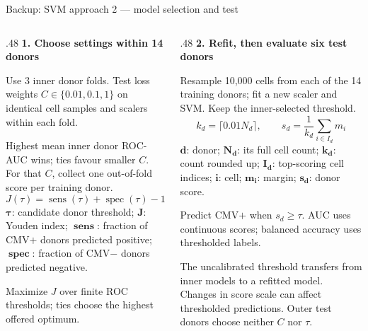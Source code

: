 \documentclass[aspectratio=169,10pt]{beamer}
\newcommand{\eyebrow}[1]{{\color{Teal}\bfseries #1}\par\smallskip}
\newcommand{\compactmath}{%
  \setlength{\abovedisplayskip}{4pt}\setlength{\belowdisplayskip}{4pt}%
  \setlength{\abovedisplayshortskip}{2pt}\setlength{\belowdisplayshortskip}{4pt}}
\begin{document}
\begin{frame}{Backup: SVM approach 2 --- model selection and test}
  \small\compactmath
  \begin{columns}[T,onlytextwidth]
    \begin{column}{.48\textwidth}
      \eyebrow{1. Choose settings within 14 donors}
      \small Use 3 inner donor folds. Test loss weights $C\in\{0.01,0.1,1\}$ on identical cell samples and scalers within each fold.\par\smallskip
      Highest mean inner donor ROC-AUC wins; ties favour smaller $C$. For that $C$, collect one out-of-fold score per training donor.
      \[J(\tau)=\operatorname{sens}(\tau)+\operatorname{spec}(\tau)-1\]
      {\scriptsize $\boldsymbol{\tau}$: candidate donor threshold; $\boldsymbol{J}$: Youden index; $\boldsymbol{\operatorname{sens}}$: fraction of CMV$+$ donors predicted positive; $\boldsymbol{\operatorname{spec}}$: fraction of CMV$-$ donors predicted negative.}\par\smallskip
      \small Maximize $J$ over finite ROC thresholds; ties choose the highest offered optimum.
    \end{column}
    \begin{column}{.48\textwidth}
      \eyebrow{2. Refit, then evaluate six test donors}
      \small Resample 10,000 cells from each of the 14 training donors; fit a new scaler and SVM. Keep the inner-selected threshold.
      \[k_d=\lceil0.01N_d\rceil,\qquad
        s_d=\frac{1}{k_d}\sum_{i\in I_d}m_i\]
      {\scriptsize $\boldsymbol{d}$: donor; $\boldsymbol{N_d}$: its full cell count; $\boldsymbol{k_d}$: count rounded up; $\boldsymbol{I_d}$: top-scoring cell indices; $\boldsymbol{i}$: cell; $\boldsymbol{m_i}$: margin; $\boldsymbol{s_d}$: donor score.}\par\smallskip
      \small Predict CMV$+$ when $s_d\geq\tau$. AUC uses continuous scores; balanced accuracy uses thresholded labels.\par\medskip
      {\scriptsize The uncalibrated threshold transfers from inner models to a refitted model. Changes in score scale can affect thresholded predictions. Outer test donors choose neither $C$ nor $\tau$.}
    \end{column}
  \end{columns}
\end{frame}
\end{document}

